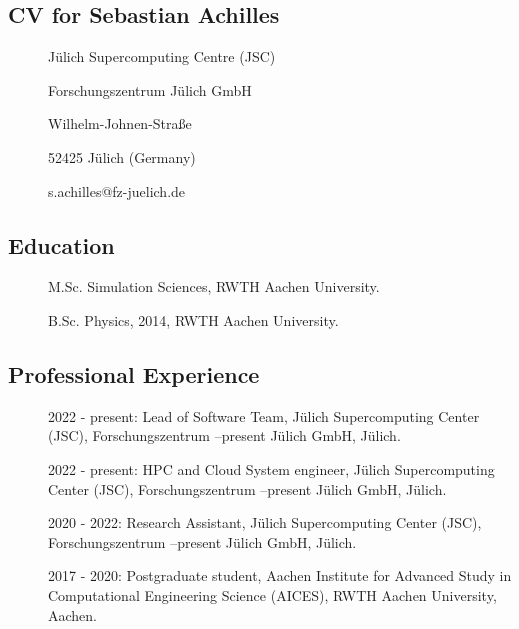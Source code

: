 
\subsection{CV for Sebastian Achilles}


\begin{description}
\item[] J\"ulich Supercomputing Centre (JSC)
\item[] Forschungszentrum J\"ulich GmbH
\item[] Wilhelm-Johnen-Stra{\ss}e
\item[] 52425 J\"ulich (Germany)
\item[] s.achilles@fz-juelich.de
\end{description}

\subsection*{Education}

\begin{description}
\item[] M.Sc. Simulation Sciences, RWTH Aachen University.
\item[] B.Sc. Physics, 2014, RWTH Aachen University.
\end{description}

\subsection*{Professional Experience}

\begin{description}
\item[] 2022 - present: Lead of Software Team, Jülich Supercomputing Center (JSC), Forschungszentrum
–present Jülich GmbH, Jülich.
\item[] 2022 - present: HPC and Cloud System engineer, Jülich Supercomputing Center (JSC), Forschungszentrum
–present Jülich GmbH, Jülich.
\item[] 2020 - 2022: Research Assistant, Jülich Supercomputing Center (JSC), Forschungszentrum
–present Jülich GmbH, Jülich.
\item[] 2017 - 2020: Postgraduate student, Aachen Institute for Advanced Study in Computational Engineering Science (AICES), RWTH Aachen University, Aachen.

\end{description}

